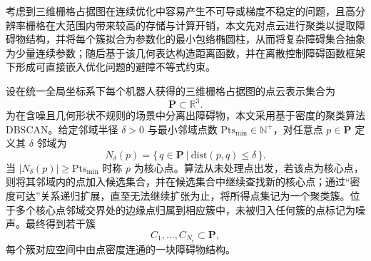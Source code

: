 考虑到三维栅格占据图在连续优化中容易产生不可导或梯度不稳定的问题，且高分辨率栅格在大范围内带来较高的存储与计算开销，本文先对点云进行聚类以提取障碍物结构，并将每个簇拟合为参数化的最小包络椭圆柱，从而将复杂障碍集合抽象为少量连续参数；随后基于该几何表达构造距离函数，并在离散控制障碍函数框架下形成可直接嵌入优化问题的避障不等式约束。

设在统一全局坐标系下每个机器人获得的三维栅格占据图的点云表示集合为
\begin{equation}
\mathbf{P}\subset\mathbb{R}^3.
\end{equation}
为在含噪且几何形状不规则的场景中分离出障碍物，本文采用基于密度的聚类算法 DBSCAN\cite{dbscan}。给定邻域半径 $\delta>0$ 与最小邻域点数 $\mathrm{Pts}_{\min}\in\mathbb{N}^+$，对任意点 $p\in \mathbf{P}$ 定义其 $\delta$ 邻域为
\begin{equation}
N_\delta(p)=\big\{\,q\in \mathbf{P}\ \big|\ \mathrm{dist}(p,q)\le\delta\,\big\}.
\label{eq:dbscan_nei}
\end{equation}
当 $|N_\delta(p)|\ge \mathrm{Pts}_{\min}$ 时称 $p$ 为核心点。算法从未处理点出发，若该点为核心点，则将其邻域内的点加入候选集合，并在候选集合中继续查找新的核心点；通过“密度可达”关系递归扩展，直至无法继续扩张为止，将所得点集记为一个聚类簇。位于多个核心点邻域交界处的边缘点归属到相应簇中，未被归入任何簇的点标记为噪声。最终得到若干簇
\begin{equation}
C_1,\dots,C_{N_c}\subset \mathbf{P},
\end{equation}
每个簇对应空间中由点密度连通的一块障碍物结构。


